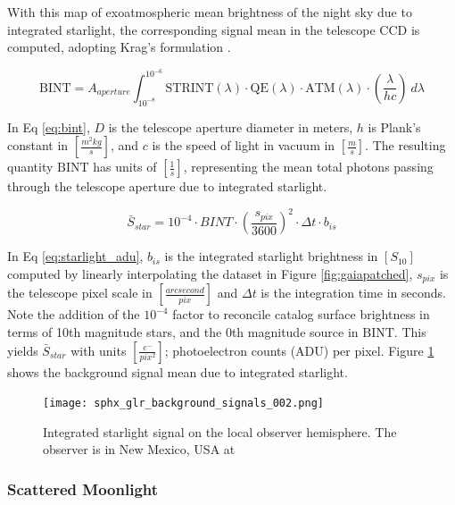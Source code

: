 With this map of exoatmospheric mean brightness of the night sky due to integrated
starlight, the corresponding signal mean in the telescope CCD is computed, adopting Krag's formulation \cite{krag2003}.

\begin{equation} \label{eq:bint}
 \textrm{BINT} = A_{aperture}
  \int_{10^{-8}}^{10^{-6}}{ \textrm{STRINT}(\lambda) \cdot \textrm{QE}(\lambda) \cdot \textrm{ATM}(\lambda)
  \cdot \left( \frac{\lambda}{h c} \right) \: d\lambda}  
\end{equation}

In Eq \ref{eq:bint}, $D$ is the telescope aperture diameter in meters, $h$ is Plank's constant in
$\left[ \frac{m^2 kg}{s} \right]$, and $c$
is the speed of light in vacuum in $\left[ \frac{m}{s} \right]$. The resulting quantity
$\textrm{BINT}$ has units of $\left[ \frac{1}{s} \right]$, representing the mean total photons passing
through the telescope aperture due to integrated starlight. 

\begin{equation} \label{eq:starlight_adu}
  \bar{S}_{star} = 10^{-4} \cdot BINT \cdot \left( \frac{s_{pix}}{3600} \right)^2 \cdot \Delta t \cdot
  b_{is}
\end{equation}

In Eq \ref{eq:starlight_adu}, $b_{is}$ is the integrated starlight brightness in $\left[ S_{10}
\right]$ computed by linearly interpolating the dataset in Figure \ref{fig:gaiapatched}, $s_{pix}$ is the telescope pixel scale in $\left[ \frac{arcsecond}{pix} \right]$ and $\Delta t$ is the integration time in seconds. Note the addition of the $10^{-4}$ factor to reconcile catalog surface brightness in terms of 10th magnitude stars, and the 0th magnitude source in $\textrm{BINT}$. This yields $\bar{S}_{star}$ with units $\left[ \frac{e^-}{pix^2} \right]$; photoelectron counts (ADU) per pixel. Figure \ref{fig:starlight_hemi} shows the background signal mean due to integrated starlight.

\begin{figure}[ht]
  \centering
  \texttt{[image: sphx\_glr\_background\_signals\_002.png]}
  \caption{Integrated starlight signal on the local observer hemisphere. The observer is in New Mexico, USA at
  \pogslla}
  \label{fig:starlight_hemi}
\end{figure}

\subsubsection{Scattered Moonlight}

